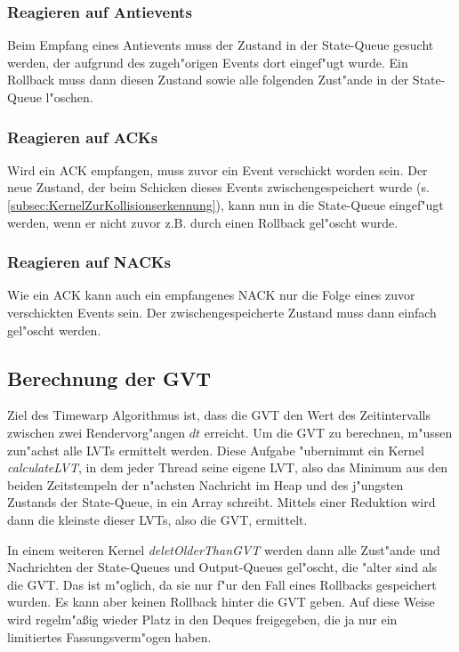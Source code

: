 \documentclass[a4paper, 10pt, openright, parskip, chapterprefix]{scrreprt}
\begin{document}
\subsubsection{Reagieren auf Antievents}
Beim Empfang eines Antievents muss der Zustand in der State-Queue gesucht werden, der aufgrund des zugeh"origen Events
dort eingef"ugt wurde. Ein Rollback muss dann diesen Zustand sowie alle folgenden Zust"ande in der State-Queue
l"oschen.

\subsubsection{Reagieren auf ACKs}
\label{subsubsed:ReagierenAufACKs}
Wird ein ACK empfangen, muss zuvor ein Event verschickt worden sein. Der neue Zustand, der beim Schicken dieses
Events zwischengespeichert wurde (s. \ref{subsec:KernelZurKollisionserkennung}), kann nun in die State-Queue eingef"ugt
werden, wenn er nicht zuvor z.B. durch einen Rollback gel"oscht wurde.

\subsubsection{Reagieren auf NACKs}
Wie ein ACK kann auch ein empfangenes NACK nur die Folge eines zuvor verschickten Events sein. Der zwischengespeicherte
Zustand muss dann einfach gel"oscht werden.

\subsection{Berechnung der GVT}
Ziel des Timewarp Algorithmus ist, dass die GVT den Wert des Zeitintervalls zwischen zwei Rendervorg"angen $dt$
erreicht. Um die GVT zu berechnen, m"ussen zun"achst alle LVTs ermittelt werden. Diese Aufgabe "ubernimmt ein Kernel
\emph{calculateLVT}, in dem jeder Thread seine eigene LVT, also das Minimum aus den beiden Zeitstempeln der
n"achsten Nachricht im Heap und des j"ungsten Zustands der State-Queue, in ein Array schreibt. Mittels einer Reduktion
wird dann die kleinste dieser LVTs, also die GVT, ermittelt.

In einem weiteren Kernel \emph{deletOlderThanGVT} werden dann alle Zust"ande und Nachrichten der State-Queues und
Output-Queues gel"oscht, die "alter sind als die GVT. Das ist m"oglich, da sie nur f"ur den Fall eines Rollbacks
gespeichert wurden. Es kann aber keinen Rollback hinter die GVT geben. Auf diese Weise wird regelm"a\ss ig wieder Platz
in den Deques freigegeben, die ja nur ein limitiertes Fassungsverm"ogen haben.
\end{document}
